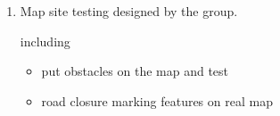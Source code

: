 \documentclass[11pt, a4paper]{article}
\begin{document}
\begin{enumerate}
\item Map site testing designed by the group.

including
\begin {itemize}
\item put obstacles on the map and test
\item road closure marking features on real map
\end {itemize}

\end{enumerate}
\end{document}
